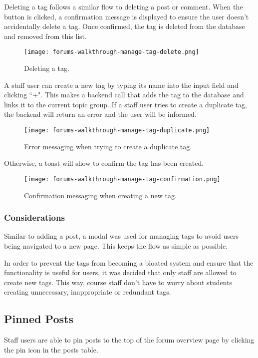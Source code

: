 Deleting a tag follows a similar flow to deleting a post or comment.
When the button is clicked, a confirmation message is displayed to ensure the user doesn't accidentally delete a tag.
Once confirmed, the tag is deleted from the database and removed from this list.

\newpage

\begin{figure}[h!]
    \texttt{[image: forums-walkthrough-manage-tag-delete.png]}
    \centering
    \caption{Deleting a tag.}
\end{figure}

A staff user can create a new tag by typing its name into the input field and clicking ``+".
This makes a backend call that adds the tag to the database and links it to the current topic group.
If a staff user tries to create a duplicate tag, the backend will return an error and the user will be informed.

\begin{figure}[h!]
    \texttt{[image: forums-walkthrough-manage-tag-duplicate.png]}
    \centering
    \caption{Error messaging when trying to create a duplicate tag.}
\end{figure}

Otherwise, a toast will show to confirm the tag has been created.

\begin{figure}[h!]
    \texttt{[image: forums-walkthrough-manage-tag-confirmation.png]}
    \centering
    \caption{Confirmation messaging when creating a new tag.}
\end{figure}

\subsubsection{Considerations}
Similar to adding a post, a modal was used for managing tags to avoid users being navigated to a new page.
This keeps the flow as simple as possible.

In order to prevent the tags from becoming a bloated system and ensure that the functionality is useful for users, it was decided that only staff are allowed to create new tags.
This way, course staff don't have to worry about students creating unnecessary, inappropriate or redundant tags.

\subsection{Pinned Posts}
Staff users are able to pin posts to the top of the forum overview page by clicking the pin icon in the posts table.

